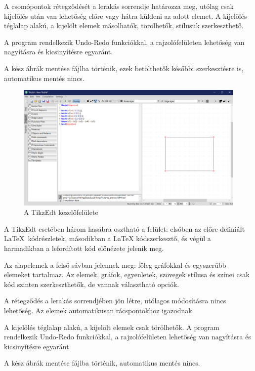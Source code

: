 A csomópontok rétegződését a lerakás sorrendje határozza meg, utólag csak kijelölés után van lehetőség előre vagy hátra küldeni az adott elemet. A kijelölés téglalap alakú, a kijelölt elemek másolhatók, törölhetők, stílusuk szerkeszthető.  

A program rendelkezik Undo-Redo funkciókkal, a rajzolófelületen lehetőség van nagyításra és kicsinyítésre egyaránt. 

A kész ábrák mentése fájlba történik, ezek betölthetők későbbi szerkesztésre is, automatikus mentés nincs.


\begin{figure}[!h]
	\includegraphics[width=\textwidth]{images/tikzedt.png}
	\caption{A TikzEdt kezelőfelülete \cite{tikzedt}}
\label{fig:tikzedt}
\end{figure}

A TikzEdt esetében három hasábra osztható a felület: elsőben az előre definiált \LaTeX\ kódrészletek, másodikban a LaTeX kódszerkesztő, és végül a harmadikban a lefordított kód előnézete jelenik meg. 

Az alapelemek a felső sávban jelennek meg: főleg gráfokkal és egyszerűbb elemeket tartalmaz. Az elemek, gráfok, egyenletek, szövegek stílusa és színei csak kód szinten szerkeszthetők, de vannak választható opciók. 

A rétegződés a lerakás sorrendjében jön létre, utólagos módosításra nincs lehetőség. Az elemek automatikusan rácspontokhoz igazodnak. 

A kijelölés téglalap alakú, a kijelölt elemek csak törölhetők. A program rendelkezik Undo-Redo funkciókkal, a rajzolófelületen lehetőség van nagyításra és kicsinyítésre egyaránt. 

A kész ábrák mentése fájlba történik, automatikus mentés nincs.

